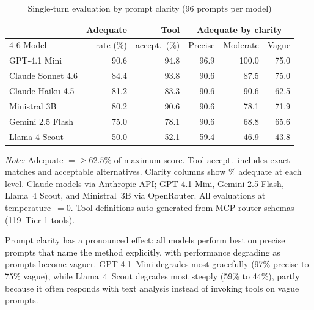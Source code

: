 \begin{table}[htbp]
\centering
\begin{threeparttable}
\caption{Single-turn evaluation by prompt clarity (96 prompts per model)}
\label{tab:e2e-results}
\small
\begin{tabular}{lrrrrr}
\toprule
 & Adequate & Tool & \multicolumn{3}{c}{Adequate by clarity} \\
\cmidrule(lr){4-6}
Model & rate (\%) & accept.\ (\%) & Precise & Moderate & Vague \\
\midrule
GPT-4.1 Mini       & 90.6 & 94.8 & 96.9 & 100.0 & 75.0 \\
Claude Sonnet 4.6  & 84.4 & 93.8 & 90.6 & 87.5 & 75.0 \\
Claude Haiku 4.5   & 81.2 & 83.3 & 90.6 & 90.6 & 62.5 \\
Ministral 3B       & 80.2 & 90.6 & 90.6 & 78.1 & 71.9 \\
Gemini 2.5 Flash   & 75.0 & 78.1 & 90.6 & 68.8 & 65.6 \\
Llama 4 Scout      & 50.0 & 52.1 & 59.4 & 46.9 & 43.8 \\
\bottomrule
\end{tabular}
\begin{tablenotes}[flushleft]
\item \emph{Note:} Adequate $= \geq 62.5\%$ of maximum score.
Tool accept.\ includes exact matches and acceptable alternatives.
Clarity columns show \% adequate at each level.
Claude models via Anthropic API; GPT-4.1 Mini, Gemini 2.5 Flash,
Llama~4 Scout, and Ministral~3B via OpenRouter.
All evaluations at temperature~$=0$.  Tool definitions auto-generated
from MCP router schemas (119~Tier-1 tools).
\end{tablenotes}
\end{threeparttable}
\end{table}

Prompt clarity has a pronounced effect: all models perform best on
precise prompts that name the method explicitly, with performance
degrading as prompts become vaguer.  GPT-4.1~Mini degrades most
gracefully (97\% precise to 75\% vague), while Llama~4~Scout degrades
most steeply (59\% to 44\%), partly because it often responds with
text analysis instead of invoking tools on vague prompts.


